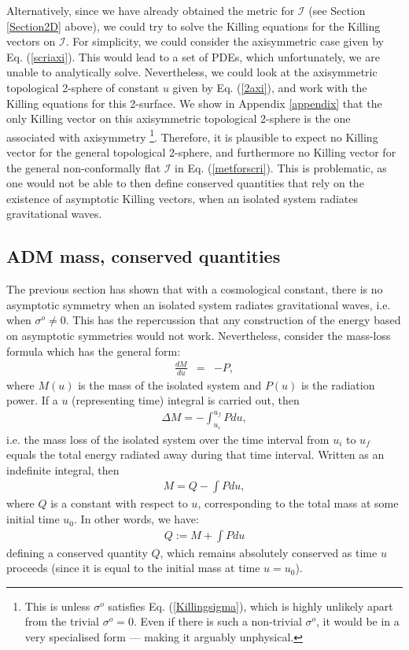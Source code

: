 \documentclass[aps,pre,preprint,superscriptaddress,showpacs,showkeys]{revtex4-1}
\begin{document}
Alternatively, since we have already obtained the metric for $\mathcal{I}$ \cite{Vee2016} (see Section \ref{Section2D} above), we could try to solve the Killing equations for the Killing vectors on $\mathcal{I}$. For simplicity, we could consider the axisymmetric case given by Eq. (\ref{scriaxi}). This would lead to a set of PDEs, which unfortunately, we are unable to analytically solve. Nevertheless, we could look at the axisymmetric topological 2-sphere of constant $u$ given by Eq. (\ref{2axi}), and work with the Killing equations for this 2-surface. We show in Appendix \ref{appendix} that the only Killing vector on this axisymmetric topological 2-sphere is the one associated with axisymmetry \footnote{This is unless $\sigma^o$ satisfies Eq. (\ref{Killingsigma}), which is highly unlikely apart from the trivial $\sigma^o=0$. Even if there is such a non-trivial $\sigma^o$, it would be in a very specialised form --- making it arguably unphysical.}. Therefore, it is plausible to expect no Killing vector for the general topological 2-sphere, and furthermore no Killing vector for the general non-conformally flat $\mathcal{I}$ in Eq. (\ref{metforscri}). This is problematic, as one would not be able to then define conserved quantities that rely on the existence of asymptotic Killing vectors, when an isolated system radiates gravitational waves.

\subsection{ADM mass, conserved quantities}\label{Section4C}

The previous section has shown that with a cosmological constant, there is no asymptotic symmetry when an isolated system radiates gravitational waves, i.e. when $\sigma^o\neq0$. This has the repercussion that any construction of the energy based on asymptotic symmetries would not work. Nevertheless, consider the mass-loss formula which has the general form:
\begin{eqnarray}\label{MP}
\frac{dM}{du}&=&-P,
\end{eqnarray}
where $M(u)$ is the mass of the isolated system and $P(u)$ is the radiation power. If a $u$ (representing time) integral is carried out, then
\begin{eqnarray}
\Delta M=-\int_{u_i}^{u_f}{Pdu},
\end{eqnarray}
i.e. the mass loss of the isolated system over the time interval from $u_i$ to $u_f$ equals the total energy radiated away during that time interval. Written as an indefinite integral, then
\begin{eqnarray}
M=Q-\int{Pdu},
\end{eqnarray}
where $Q$ is a constant with respect to $u$, corresponding to the total mass at some initial time $u_0$. In other words, we have:
\begin{eqnarray}\label{Q}
Q:=M+\int{Pdu}
\end{eqnarray}
defining a conserved quantity $Q$, which remains absolutely conserved as time $u$ proceeds (since it is equal to the initial mass at time $u=u_0$).
\end{document}
